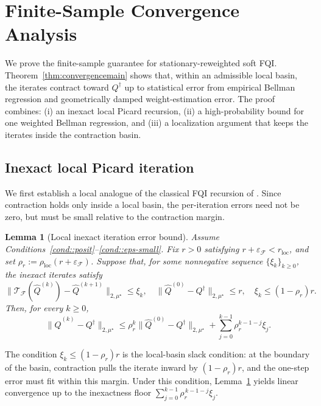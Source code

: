 \documentclass{article}
\theoremstyle{plain}
\newtheorem{lemma}{Lemma}
\theoremstyle{definition}
\theoremstyle{remark}
\begin{document}
\section{Finite-Sample Convergence Analysis}
\label{sec::finitesample}

We prove the finite-sample guarantee for stationary-reweighted soft FQI\@.
Theorem~\ref{thm:convergencemain} shows that, within an admissible local basin,
the iterates contract toward \(Q^\dagger\) up to statistical error from empirical
Bellman regression and geometrically damped weight-estimation error. The proof
combines: (i) an inexact local Picard recursion, (ii) a high-probability bound
for one weighted Bellman regression, and (iii) a localization argument that keeps
the iterates inside the contraction basin.

\subsection{Inexact local Picard iteration}

We first establish a local analogue of the classical FQI recursion of
\citet{munos2008finite}. Since contraction holds only inside a local basin, the
per-iteration errors need not be zero, but must be small relative to the
contraction margin.

\begin{lemma}[Local inexact iteration error bound]
\label{lem:inexact-fqi}
Assume Conditions~\ref{cond::posit}--\ref{cond::eps-small}. Fix
\(r>0\) satisfying \(r+\varepsilon_{\mathcal F}<r_{\mathrm{loc}}\), and set
\(\rho_r:=\rho_{\mathrm{loc}}(r+\varepsilon_{\mathcal F})\). Suppose that, for some nonnegative
sequence \(\{\xi_k\}_{k\ge0}\), the inexact iterates satisfy
\[
\|\mathcal T_{\mathcal F}(\widehat Q^{(k)}) - \widehat Q^{(k+1)}\|_{2,\mu^\star}\le \xi_k,\quad
\|\widehat Q^{(0)}-Q^\dagger\|_{2,\mu^\star}\le r,\quad
\xi_k\le (1-\rho_r)r.
\]
Then, for every \(k\ge0\),
\[
\|\widehat Q^{(k)}-Q^\dagger\|_{2,\mu^\star}
\le
\rho_r^k\|\widehat Q^{(0)}-Q^\dagger\|_{2,\mu^\star}
+
\sum_{j=0}^{k-1}\rho_r^{k-1-j}\xi_j.
\]
\end{lemma}

The condition \(\xi_k \le (1-\rho_r)r\) is the local-basin slack condition:
at the boundary of the basin, contraction pulls the iterate inward by
\((1-\rho_r)r\), and the one-step error must fit within this margin.
Under this condition, Lemma~\ref{lem:inexact-fqi} yields linear convergence up
to the inexactness floor
\(\sum_{j=0}^{k-1} \rho_r^{\,k-1-j}\xi_j\).
\end{document}
